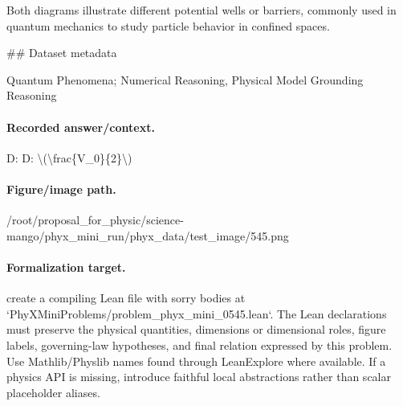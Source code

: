 Both diagrams illustrate different potential wells or barriers, commonly used in quantum mechanics to study particle behavior in confined spaces.

\#\# Dataset metadata

Quantum Phenomena; Numerical Reasoning, Physical Model Grounding Reasoning

\paragraph{Recorded answer/context.}
D: D: \textbackslash{}(\textbackslash{}frac\{V\_0\}\{2\}\textbackslash{})

\paragraph{Figure/image path.}
/root/proposal\_for\_physic/science-mango/phyx\_mini\_run/phyx\_data/test\_image/545.png

\paragraph{Formalization target.}
create a compiling Lean file with sorry bodies at `PhyXMiniProblems/problem\_phyx\_mini\_0545.lean`. The Lean declarations must preserve the physical quantities, dimensions or dimensional roles, figure labels, governing-law hypotheses, and final relation expressed by this problem.
Use Mathlib/Physlib names found through LeanExplore where available. If a physics API is missing, introduce faithful local abstractions rather than scalar placeholder aliases.

